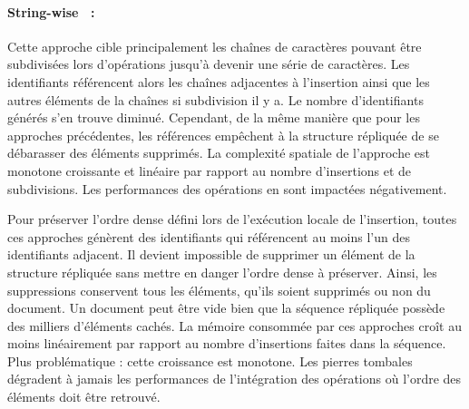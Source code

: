 \paragraph{String-wise~\cite{yu2012stringwise} :} Cette approche cible
principalement les chaînes de caractères pouvant être subdivisées lors
d'opérations jusqu'à devenir une série de caractères. Les identifiants
référencent alors les chaînes adjacentes à l'insertion ainsi que les autres
éléments de la chaînes si subdivision il y a. Le nombre d'identifiants générés
s'en trouve diminué. Cependant, de la même manière que pour les approches
précédentes, les références empêchent à la structure répliquée de se débarasser
des éléments supprimés. La complexité spatiale de l'approche est monotone
croissante et linéaire par rapport au nombre d'insertions et de
subdivisions. Les performances des opérations en sont impactées négativement.


Pour préserver l'ordre dense défini lors de l'exécution locale de l'insertion,
toutes ces approches génèrent des identifiants qui référencent au moins l'un
des identifiants adjacent. Il devient impossible de supprimer un élément de la
structure répliquée sans mettre en danger l'ordre dense à préserver. Ainsi, les
suppressions conservent tous les éléments, qu'ils soient supprimés ou non du
document.  Un document peut être vide bien que la séquence répliquée possède des
milliers d'éléments cachés. La mémoire consommée par ces approches croît au
moins linéairement par rapport au nombre d'insertions faites dans la séquence. Plus
problématique : cette croissance est monotone.  Les pierres tombales dégradent à
jamais les performances de l'intégration des opérations où l'ordre des éléments
doit être retrouvé.

